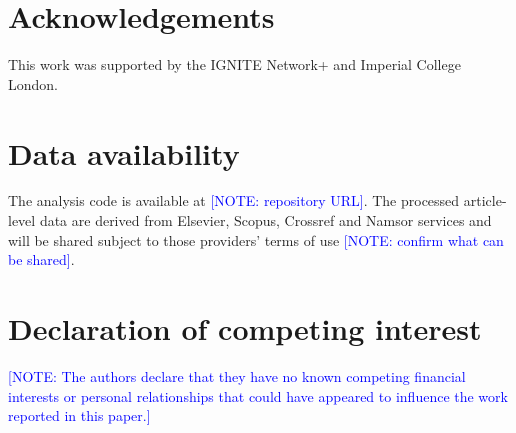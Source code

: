 \documentclass[preprint,12pt,number]{elsarticle}
\newcommand{\note}[1]{\textcolor{blue}{[NOTE: #1]}}
\begin{document}
\section*{Acknowledgements}
This work was supported by the IGNITE Network+ and Imperial College London.

\section*{Data availability}
The analysis code is available at \note{repository URL}. The processed article-level data are derived from Elsevier, Scopus, Crossref and Namsor services and will be shared subject to those providers' terms of use \note{confirm what can be shared}.

\section*{Declaration of competing interest}
\note{The authors declare that they have no known competing financial interests or personal relationships that could have appeared to influence the work reported in this paper.}
\end{document}
